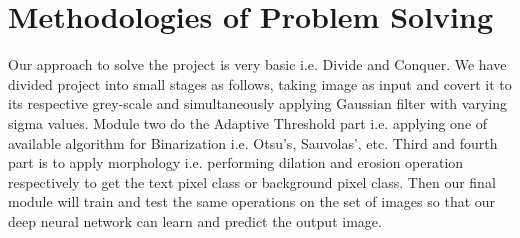 \documentclass[oneside,a4paper,12pt]{report}
\begin{document}
\section{Methodologies of Problem Solving}
Our approach to solve the project is very basic i.e. Divide and Conquer. We have divided project into small stages as follows, taking image as input and covert it to its respective grey-scale and simultaneously applying Gaussian filter with varying sigma values. Module two do the Adaptive Threshold part i.e. applying
one of available algorithm for Binarization i.e. Otsu's, Sauvolas', etc. Third and fourth part is to apply morphology i.e. performing dilation and erosion operation respectively to get the text pixel class or background pixel class. Then our final module will train and test the same operations on the set of images so that our deep neural network can learn and predict the output image. 
\end{document}
